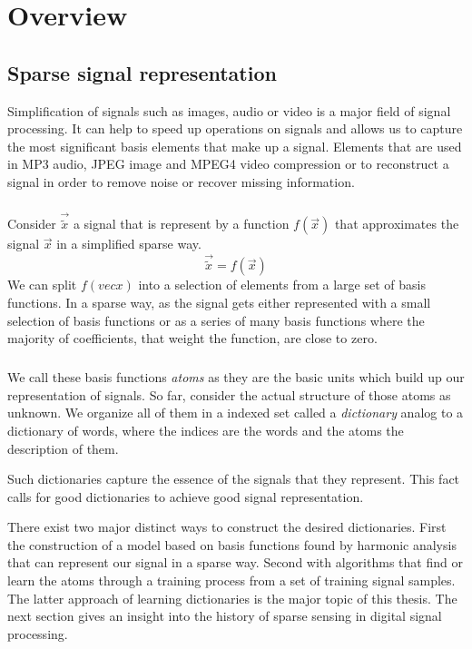 \chapter{Overview}

\section{Sparse signal representation}
\label{sec:dicts}
Simplification of signals such as images, audio or video is a major
field of signal processing. It can help to speed up operations on signals and
allows us to capture the most significant basis elements that make up a signal.
Elements that are used in MP3 audio, JPEG image and MPEG4 video compression or
to reconstruct a signal in order to remove noise or recover missing information.

\paragraph{}
Consider $\vec{\tilde{x}}$ a signal that is represent by a function $f(\vec{x})$
that
approximates the signal $\vec{x}$ in a simplified sparse way.
\begin{equation*}
\vec{\tilde{x}} = f\left(\vec{x}\right)
\end{equation*}
We can split $f(vec{x})$ into a selection of elements from a large set of
basis functions. In a sparse way, as the signal gets either represented with
a small selection of basis functions or as a series of many basis
functions where the majority of coefficients, that weight the function, are
close to zero. 

\paragraph{}
We call these basis functions \emph{atoms} as they are the basic units
which build up our representation of signals. So far, consider the actual
structure of those atoms as unknown. We organize all of them in a
indexed set called a \emph{dictionary} analog to a dictionary of words, where
the indices are the words and the atoms the description of them. 

Such dictionaries capture the essence of the signals that they represent.
This fact calls for good dictionaries to achieve good signal representation.

There exist two major distinct ways to construct the desired dictionaries. 
First the construction of a model based on basis functions found by harmonic
analysis that can represent our signal in a sparse way. Second with
algorithms that find or learn the atoms through a training process from a set of
training signal samples. The latter approach of learning dictionaries is the
major topic of this thesis. The next section gives an insight into the history
of sparse sensing in digital signal processing. 




